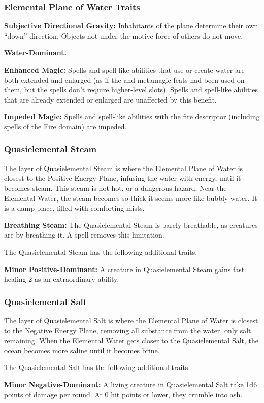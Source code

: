 \subsubsection{Elemental Plane of Water Traits}
\begin{itemize*}
\item \textbf{Subjective Directional Gravity:} Inhabitants of the plane determine their own ``down'' direction. Objects not under the motive force of others do not move.
\item \textbf{Water-Dominant.}
\item \textbf{Enhanced Magic:} Spells and spell-like abilities that use or create water are both extended and enlarged (as if the  and  metamagic feats had been used on them, but the spells don't require higher-level slots). Spells and spell-like abilities that are already extended or enlarged are unaffected by this benefit.
\item \textbf{Impeded Magic:} Spells and spell-like abilities with the fire descriptor (including spells of the Fire domain) are impeded.
\end{itemize*}


\subsubsection{Quasielemental Steam}
The layer of Quasielemental Steam is where the Elemental Plane of Water is closest to the Positive Energy Plane, infusing the water with energy, until it becomes steam. This steam is not hot, or a dangerous hazard. Near the Elemental Water, the steam becomes so thick it seems more like bubbly water. It is a damp place, filled with comforting mists.

\textbf{Breathing Steam:} The Quasielemental Steam is barely breathable, as creatures are  by breathing it. A  spell removes this limitation.

The Quasielemental Steam has the following additional traits.
\begin{itemize*}
\item \textbf{Minor Positive-Dominant:} A creature in Quasielemental Steam gains fast healing 2 as an extraordinary ability.
\end{itemize*}

\subsubsection{Quasielemental Salt}
The layer of Quasielemental Salt is where the Elemental Plane of Water is closest to the Negative Energy Plane, removing all substance from the water, only salt remaining. When the Elemental Water gets closer to the Quasielemental Salt, the ocean becomes more saline until it becomes brine.

The Quasielemental Salt has the following additional traits.
\begin{itemize*}
\item \textbf{Minor Negative-Dominant:} A living creature in Quasielemental Salt take 1d6 points of damage per round. At 0 hit points or lower, they crumble into ash.
\end{itemize*}
